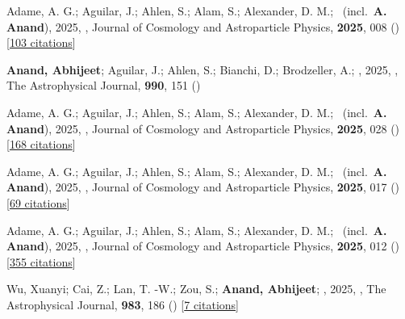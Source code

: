 \item[{\color{numcolor}\scriptsize20}] Adame, A. G.; Aguilar, J.; Ahlen, S.; Alam, S.; Alexander, D. M.; \etal\ (incl.\ \textbf{A. Anand}), 2025, , Journal of Cosmology and Astroparticle Physics, \textbf{2025}, 008 () [\href{https://ui.adsabs.harvard.edu/abs/2025JCAP...09..008A}{103 citations}]

\item[{\color{numcolor}\scriptsize19}] \textbf{Anand, Abhijeet}; Aguilar, J.; Ahlen, S.; Bianchi, D.; Brodzeller, A.; \etal, 2025, , The Astrophysical Journal, \textbf{990}, 151 ()

\item[{\color{numcolor}\scriptsize18}] Adame, A. G.; Aguilar, J.; Ahlen, S.; Alam, S.; Alexander, D. M.; \etal\ (incl.\ \textbf{A. Anand}), 2025, , Journal of Cosmology and Astroparticle Physics, \textbf{2025}, 028 () [\href{https://ui.adsabs.harvard.edu/abs/2025JCAP...07..028A}{168 citations}]

\item[{\color{numcolor}\scriptsize17}] Adame, A. G.; Aguilar, J.; Ahlen, S.; Alam, S.; Alexander, D. M.; \etal\ (incl.\ \textbf{A. Anand}), 2025, , Journal of Cosmology and Astroparticle Physics, \textbf{2025}, 017 () [\href{https://ui.adsabs.harvard.edu/abs/2025JCAP...07..017A}{69 citations}]

\item[{\color{numcolor}\scriptsize16}] Adame, A. G.; Aguilar, J.; Ahlen, S.; Alam, S.; Alexander, D. M.; \etal\ (incl.\ \textbf{A. Anand}), 2025, , Journal of Cosmology and Astroparticle Physics, \textbf{2025}, 012 () [\href{https://ui.adsabs.harvard.edu/abs/2025JCAP...04..012A}{355 citations}]

\item[{\color{numcolor}\scriptsize15}] Wu, Xuanyi; Cai, Z.; Lan, T. -W.; Zou, S.; \textbf{Anand, Abhijeet}; \etal, 2025, , The Astrophysical Journal, \textbf{983}, 186 () [\href{https://ui.adsabs.harvard.edu/abs/2025ApJ...983..186W}{7 citations}]


